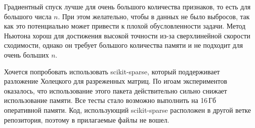 \documentclass[notitlepage]{article}
\begin{document}
Градиентный спуск лучше для очень большого количества признаков, то есть для большого числа $n$.
При этом желательно, чтобы в данных не было выбросов, так как это потенциально может привести к плохой обусловленности задачи.
Метод Ньютона хорош для достижения высокой точности из-за сверхлинейной скорости сходимости, однако он требует 
большого количества памяти и не подходит для очень больших $n$.

Хочется попробовать использовать scikit-sparse, который поддерживает разложение Холецкого для разреженных матриц.
По игоам экспериментов оказалось, что использование этого пакета действительно сильно снижает использование памяти.
Все тесты стало возможно выполнить на 16\,Гб оперативной памяти.
Код, использующий scikit-sparse расположен в другой ветке репозитория, поэтому в прилагаемые файлы не вошел.

			
			
\end{document}
